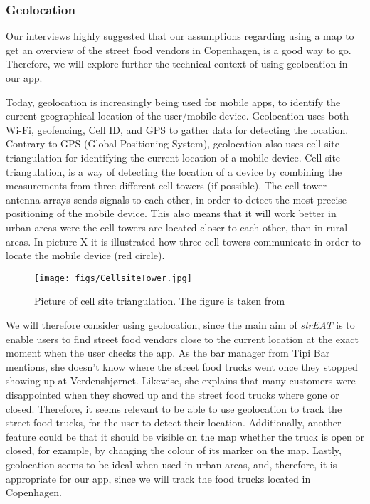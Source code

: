 \subsubsection{Geolocation}

Our interviews highly suggested that our assumptions regarding using a map to get an overview of the street food vendors in Copenhagen, is a good way to go. Therefore, we will explore further the technical context of using geolocation in our app.

Today, geolocation is increasingly being used for mobile apps, to identify the current geographical location of the user/mobile device. Geolocation uses both Wi-Fi, geofencing, Cell ID, and GPS to gather data for detecting the location. Contrary to GPS (Global Positioning System), geolocation also uses cell site triangulation for identifying the current location of a mobile device. Cell site triangulation, is a way of detecting the location of a device by combining the measurements from three different cell towers (if possible). The cell tower antenna arrays sends signals to each other, in order to detect the most precise positioning of the mobile device. This also means that it will work better in urban areas were the cell towers are located closer to each other, than in rural areas. In picture X it is illustrated how three cell towers communicate in order to locate the mobile device (red circle). \cite{GeolocationInMobileApps}

\begin{figure}[h!]
  \centering
  \texttt{[image: figs/CellsiteTower.jpg]}
  \caption{Picture of cell site triangulation. The figure is taken from \cite{CellsiteTowerSource} }
  \label{CellsiteTower}
\end{figure}




We will therefore consider using geolocation, since the main aim of \textit{strEAT} is to enable users to find street food vendors close to the current location at the exact moment when the user checks the app. As the bar manager from Tipi Bar mentions, she doesn’t know where the street food trucks went once they stopped showing up at Verdenshjørnet. Likewise, she explains that many customers were disappointed when they showed up and the street food trucks where gone or closed. Therefore, it seems relevant to be able to use geolocation to track the street food trucks, for the user to detect their location. Additionally, another feature could be that it should be visible on the map whether the truck is open or closed, for example, by changing the colour of its marker on the map. Lastly, geolocation seems to be ideal when used in urban areas, and, therefore, it is appropriate for our app, since we will track the food trucks located in Copenhagen.

